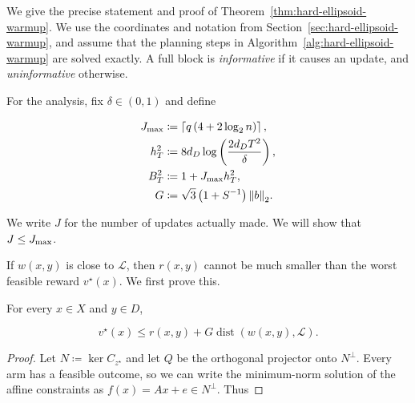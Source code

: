 {{We give the precise statement and proof of Theorem~\ref{thm:hard-ellipsoid-warmup}.
We use the coordinates and notation from Section~\ref{sec:hard-ellipsoid-warmup},
and assume that the planning steps in Algorithm~\ref{alg:hard-ellipsoid-warmup} are
solved exactly. A full block is \emph{informative} if it causes an update,
and \emph{uninformative} otherwise.


For the analysis, fix $\delta \in \left( 0 , 1 \right)$ and define


\begin{equation*}
\begin{aligned}
J_{\text{\normalfont max}} & \coloneqq \left\lceil q \left( 4 + 2 \operatorname{log}_{2} n \right) \right\rceil , \\
 h_{T}^{2} & \coloneqq 8 d_{D} \operatorname{log} \left( \frac{2 d_{D} T^{2}}{\delta} \right) , \\
 B_{T}^{2} & \coloneqq 1 + J_{\text{\normalfont max}} h_{T}^{2} , \\
 G & \coloneqq \sqrt{3} \left( 1 + S^{- 1} \right) {\left\Vert b \right\Vert}_{2} .
\end{aligned}
\end{equation*}



We write $J$ for the number of updates actually made. We will show
that $J \le J_{\text{\normalfont max}}$.

If $w \left( x , y \right)$ is close to $\mathcal{L}$, then $r \left( x , y \right)$ cannot be much smaller
than the worst feasible reward $v^{\star} \left( x \right)$. We first prove this.


\begin{lemma}\label{lem:subspace-reward-bound}

  For every $x \in X$ and $y \in D$,


\begin{equation*}
v^{\star} \left( x \right) \le r \left( x , y \right) + G \operatorname{dist} \left( w \left( x , y \right) , \mathcal{L} \right) .
\end{equation*}


\end{lemma}


\begin{proof}
Let $N \coloneqq \operatorname{ker} C_{z^{\star}}$ and let $Q$ be the orthogonal projector
onto $N^{\perp}$. Every arm has a feasible outcome, so we can write the
minimum-norm solution of the affine constraints as
$f \left( x \right) = A x + e \in N^{\perp}$. Thus



\end{proof}}}
